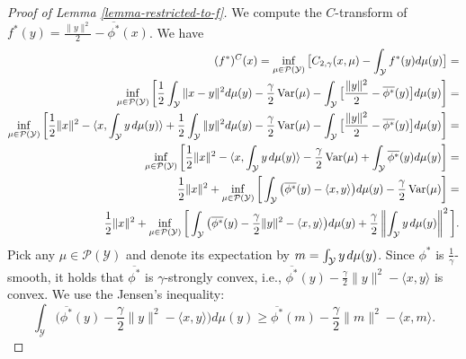 \documentclass{article} %
\DeclareMathOperator{\Var}{Var}
\begin{document}
\begin{proof}[Proof of Lemma \ref{lemma-restricted-to-f}] We compute the $C$-transform of $f^{*}(y)=\frac{\|y\|^{2}}{2}-\overline{\phi^{*}}(x)$. We have
\begin{eqnarray}
    (f^{*})^{C}(x)=\inf_{\mu\in\mathcal{P}(\mathcal{Y})}\big[C_{2,\gamma}(x,\mu)-\int_{\mathcal{Y}}f^{*}(y)d\mu(y)\big]=
    \nonumber
    \\
    \inf_{\mu\in\mathcal{P}(\mathcal{Y})}\bigg[\frac{1}{2}\int_{\mathcal{Y}}\|x-y\|^{2}d\mu(y)-\frac{\gamma}{2}\Var(\mu)-\int_{\mathcal{Y}}\big[\frac{\|y\|^{2}}{2}-\overline{\phi^{*}}(y)\big]d\mu(y)\bigg]=
    \nonumber
    \\
    \inf_{\mu\in\mathcal{P}(\mathcal{Y})}\bigg[\frac{1}{2}\|x\|^{2}-\langle x,\int_{\mathcal{Y}}y\hspace{.5mm}d\mu(y)\rangle+\frac{1}{2}\int_{\mathcal{Y}}\|y\|^{2}d\mu(y)-\frac{\gamma}{2}\Var(\mu)-\int_{\mathcal{Y}}\big[\frac{\|y\|^{2}}{2}-\overline{\phi^{*}}(y)\big]d\mu(y)\bigg]=
    \nonumber
    \\
    \inf_{\mu\in\mathcal{P}(\mathcal{Y})}\bigg[\frac{1}{2}\|x\|^{2}-\langle x,\int_{\mathcal{Y}}y\hspace{.5mm}d\mu(y)\rangle-\frac{\gamma}{2}\Var(\mu)+\int_{\mathcal{Y}}\overline{\phi^{*}}(y)d\mu(y)\bigg]=
    \nonumber
    \\
    \frac{1}{2}\|x\|^{2}+\inf_{\mu\in\mathcal{P}(\mathcal{Y})}\bigg[\int_{\mathcal{Y}}\big(\overline{\phi^{*}}(y)-\langle x,y\rangle\big)d\mu(y)-\frac{\gamma}{2}\Var(\mu)\bigg]=
    \nonumber
    \\
    \frac{1}{2}\|x\|^{2}+\inf_{\mu\in\mathcal{P}(\mathcal{Y})}\bigg[\int_{\mathcal{Y}}\big(\overline{\phi^{*}}(y)-\frac{\gamma}{2}\|y\|^{2}-\langle x,y\rangle\big)d\mu(y)+\frac{\gamma}{2}\left\|\int_{\mathcal{Y}}y\hspace{.5mm}d\mu(y)\right\|^{2}\bigg].
    \label{c-transform-restricted}
\end{eqnarray}
Pick any $\mu\in\mathcal{P}(\mathcal{Y})$ and denote its expectation by $m=\int_{\mathcal{Y}}y\hspace{.5mm}d\mu(y)$. Since $\phi^{*}$ is $\frac{1}{\gamma}$-smooth, it holds that $\overline{\phi^{*}}$ is $\gamma$-strongly convex, i.e., $\overline{\phi^{*}}(y)-\frac{\gamma}{2}\|y\|^{2}-\langle x,y\rangle$ is convex. We use the Jensen's inequality:
\begin{equation}
    \int_{\mathcal{Y}}\big(\overline{\phi^{*}}(y)-\frac{\gamma}{2}\|y\|^{2}-\langle x,y\rangle\big)d\mu(y)\geq \overline{\phi^{*}}(m)-\frac{\gamma}{2}\|m\|^{2}-\langle x,m\rangle.

\end{equation}
\end{proof}
\end{document}
